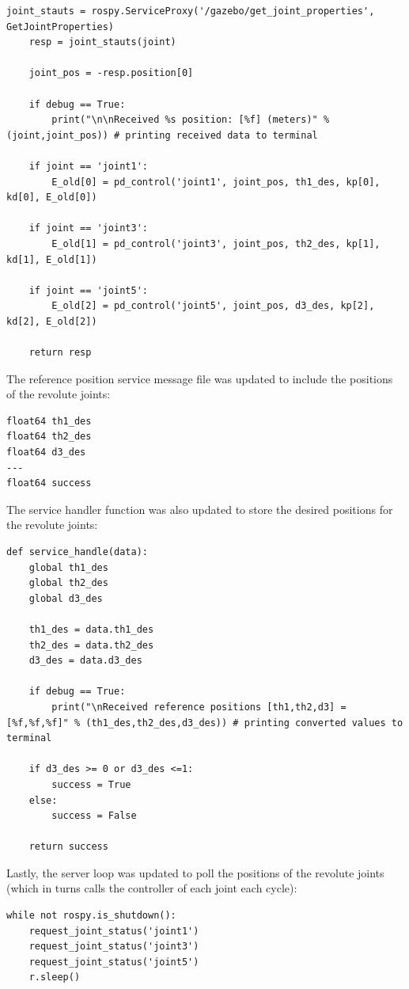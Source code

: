 \documentclass[10pt]{article}
\begin{document}
\begin{enumerate}
\begin{lstlisting}[style=Matlab-editor,basicstyle=\mlttfamily,escapechar=`]
	joint_stauts = rospy.ServiceProxy('/gazebo/get_joint_properties', GetJointProperties)
	resp = joint_stauts(joint)
	
	joint_pos = -resp.position[0]
	
	if debug == True:
		print("\n\nReceived %s position: [%f] (meters)" % (joint,joint_pos)) # printing received data to terminal
	
	if joint == 'joint1':
		E_old[0] = pd_control('joint1', joint_pos, th1_des, kp[0], kd[0], E_old[0])
	
	if joint == 'joint3':
		E_old[1] = pd_control('joint3', joint_pos, th2_des, kp[1], kd[1], E_old[1])
	
	if joint == 'joint5':
		E_old[2] = pd_control('joint5', joint_pos, d3_des, kp[2], kd[2], E_old[2])
	
	return resp
\end{lstlisting} 

	The reference position service message file was updated to include the positions of the revolute joints:
	
\begin{lstlisting}[style=Matlab-editor,basicstyle=\mlttfamily,escapechar=`]
float64 th1_des
float64 th2_des
float64 d3_des
---
float64 success
\end{lstlisting}

	The service handler function was also updated to store the desired positions for the revolute joints:
	
\begin{lstlisting}[style=Matlab-editor,basicstyle=\mlttfamily,escapechar=`]
def service_handle(data):
	global th1_des
	global th2_des
	global d3_des
	
	th1_des = data.th1_des
	th2_des = data.th2_des
	d3_des = data.d3_des
	
	if debug == True:
		print("\nReceived reference positions [th1,th2,d3] = [%f,%f,%f]" % (th1_des,th2_des,d3_des)) # printing converted values to terminal
	
	if d3_des >= 0 or d3_des <=1:
		success = True
	else:
		success = False
	
	return success
\end{lstlisting}	

	Lastly, the server loop was updated to poll the positions of the revolute joints (which in turns calls the controller of each joint each cycle):
	
\begin{lstlisting}[style=Matlab-editor,basicstyle=\mlttfamily,escapechar=`]
while not rospy.is_shutdown():
	request_joint_status('joint1')
	request_joint_status('joint3')
	request_joint_status('joint5')
	r.sleep()
\end{lstlisting}	



\end{enumerate}
\end{document}
